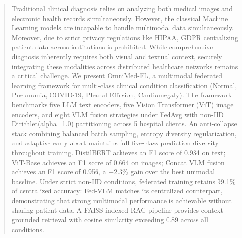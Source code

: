 \documentclass[conference]{IEEEtran}
\begin{document}
\begin{abstract}
Traditional clinical diagnosis relies on analyzing both medical images and electronic health records simultaneously. However, the classical Machine Learning models are incapable to handle multimodal data simultaneously. Moreover, due to strict privacy regulations like HIPAA, GDPR centralizing patient data across institutions is prohibited. While comprehensive diagnosis inherently requires both visual and textual context, securely integrating these modalities across distributed healthcare networks remains a critical challenge. We present OmniMed-FL, a multimodal federated learning framework for multi-class clinical condition classification (Normal, Pneumonia, COVID-19, Pleural Effusion, Cardiomegaly). The framework benchmarks five LLM text encoders, five Vision Transformer (ViT) image encoders, and eight VLM fusion strategies under FedAvg with non-IID Dirichlet(alpha=1.0) partitioning across 5 hospital clients. An anti-collapse stack combining balanced batch sampling, entropy diversity regularization, and adaptive early abort maintains full five-class prediction diversity throughout training. DistilBERT achieves an F1 score of 0.934 on text; ViT-Base achieves an F1 score of 0.664 on images; Concat VLM fusion achieves an F1 score of 0.956, a +2.3\% gain over the best unimodal baseline. Under strict non-IID conditions, federated training retains 99.1\% of centralized accuracy: Fed-VLM matches its centralized counterpart, demonstrating that strong multimodal performance is achievable without sharing patient data. A FAISS-indexed RAG pipeline provides context-grounded retrieval with cosine similarity exceeding 0.89 across all conditions.


\end{abstract}
\end{document}
